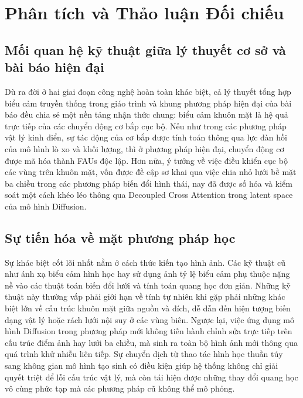 \section{Phân tích và Thảo luận Đối chiếu}

\subsection{Mối quan hệ kỹ thuật giữa lý thuyết cơ sở và bài báo hiện đại}
Dù ra đời ở hai giai đoạn công nghệ hoàn toàn khác biệt, cả lý thuyết tổng hợp biểu cảm truyền thống trong giáo trình và khung phương pháp hiện đại của bài báo đều chia sẻ một nền tảng nhận thức chung: biểu cảm khuôn mặt là hệ quả trực tiếp của các chuyển động cơ bắp cục bộ. Nếu như trong các phương pháp vật lý kinh điển, sự tác động của cơ bắp được tính toán thông qua lực đàn hồi của mô hình lò xo và khối lượng, thì ở phương pháp hiện đại, chuyển động cơ được mã hóa thành FAUs độc lập. Hơn nữa, ý tưởng về việc điều khiển cục bộ các vùng trên khuôn mặt, vốn được đề cập sơ khai qua việc chia nhỏ lưới bề mặt ba chiều trong các phương pháp biến đổi hình thái, nay đã được số hóa và kiểm soát một cách khéo léo thông qua Decoupled Cross Attention trong latent space của mô hình Diffusion.

\subsection{Sự tiến hóa về mặt phương pháp học}
Sự khác biệt cốt lõi nhất nằm ở cách thức kiến tạo hình ảnh. Các kỹ thuật cũ như ánh xạ biểu cảm hình học hay sử dụng ảnh tỷ lệ biểu cảm phụ thuộc nặng nề vào các thuật toán biến đổi lưới và tính toán quang học đơn giản. Những kỹ thuật này thường vấp phải giới hạn về tính tự nhiên khi gặp phải những khác biệt lớn về cấu trúc khuôn mặt giữa nguồn và đích, dễ dẫn đến hiện tượng biến dạng vật lý hoặc rách lưới nội suy ở các vùng biên. Ngược lại, việc ứng dụng mô hình Diffusion trong phương pháp mới không tiến hành chỉnh sửa trực tiếp trên cấu trúc điểm ảnh hay lưới ba chiều, mà sinh ra toàn bộ hình ảnh mới thông qua quá trình khử nhiễu liên tiếp. Sự chuyển dịch từ thao tác hình học thuần túy sang không gian mô hình tạo sinh có điều kiện giúp hệ thống không chỉ giải quyết triệt để lỗi cấu trúc vật lý, mà còn tái hiện được những thay đổi quang học vô cùng phức tạp mà các phương pháp cũ không thể mô phỏng.